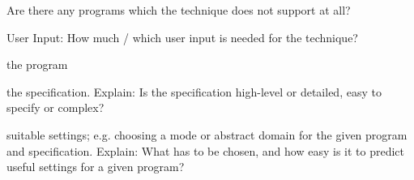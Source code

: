\documentclass[a4paper]{article}
\begin{document}
\begin{landscape}
\begin{minipage}[t]{0.2\linewidth}
\begin{betterlist}
\begin{betterlist}
\begin{betterlist}
			\end{betterlist}
			\item Are there any programs which the technique does not support at all?

		\end{betterlist}
		\item \alert{User Input:} How much / which user input is needed for the technique?
		\begin{betterlist}
			\item \checkboxChecked the program
			\item \checkboxHalfChecked the specification. Explain: Is the specification high-level or detailed, easy to specify or complex?

			\item \checkboxUnchecked suitable settings; e.g. choosing a mode or abstract domain for the given program and specification. Explain: What has to be chosen, and how easy is it to predict useful settings for a given program?


\end{betterlist}
\end{betterlist}
\end{minipage}
\end{landscape}
\end{document}

